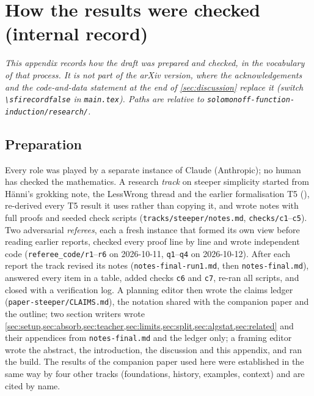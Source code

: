 \section{How the results were checked (internal record)}\label{app:verification}

\emph{This appendix records how the draft was prepared and checked, in the vocabulary of that process. It is not part of the arXiv version, where the acknowledgements and the code-and-data statement at the end of \cref{sec:discussion} replace it (switch \texttt{\textbackslash sfirecordfalse} in \texttt{main.tex}). Paths are relative to \texttt{solomonoff-function-induction/research/}.}

\subsection{Preparation}\label{app:verification:prep}

Every role was played by a separate instance of Claude (Anthropic); no human has checked the mathematics. A research \emph{track} on steeper simplicity started from H\"anni's grokking note, the LessWrong thread and the earlier formalisation T5 (\citealp[section ``Simplicity and normativity from imitation'']{claude2026whatfollows}), re-derived every T5 result it uses rather than copying it, and wrote notes with full proofs and seeded check scripts (\texttt{tracks/steeper/notes.md}, \texttt{checks/c1}--\texttt{c5}). Two adversarial \emph{referees}, each a fresh instance that formed its own view before reading earlier reports, checked every proof line by line and wrote independent code (\texttt{referee\_code/r1}--\texttt{r6} on 2026-10-11, \texttt{q1}--\texttt{q4} on 2026-10-12). After each report the track revised its notes (\texttt{notes-final-run1.md}, then \texttt{notes-final.md}), answered every item in a table, added checks \texttt{c6} and \texttt{c7}, re-ran all scripts, and closed with a verification log. A planning editor then wrote the claims ledger (\texttt{paper-steeper/CLAIMS.md}), the notation shared with the companion paper and the outline; two section writers wrote \cref{sec:setup,sec:absorb,sec:teacher,sec:limits,sec:split,sec:algstat,sec:related} and their appendices from \texttt{notes-final.md} and the ledger only; a framing editor wrote the abstract, the introduction, the discussion and this appendix, and ran the build. The results of the companion paper used here were established in the same way by four other tracks (foundations, history, examples, context) and are cited by name.

